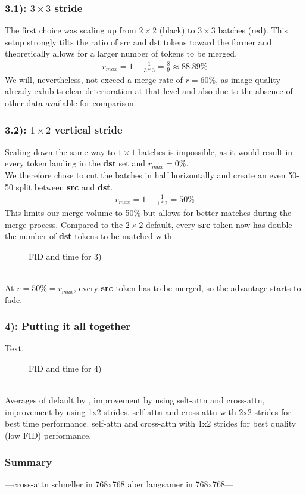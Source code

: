 \subsubsection*{3.1): $3 \times 3$ stride}
The first choice was scaling up from $2 \times 2$ (black) to $3 \times 3$ batches (red). This setup strongly tilts the ratio of src and dst tokens toward the former and theoretically allows for a larger number of tokens to be merged. 
\begin{align*}
    r_{max} = 1-\frac{1}{3*3} = \frac{8}{9} \approx 88.89\%
\end{align*}
We will, nevertheless, not exceed a merge rate of \(r=60\%\), as image quality already exhibits clear deterioration at that level and also due to the absence of other data available for comparison.



\subsubsection*{3.2): $1 \times 2$ vertical stride}
Scaling down the same way to $1 \times 1$ batches is impossible, as it would result in every token landing in the \textbf{dst} set and \(r_{max}=0\%\).\\
We therefore chose to cut the batches in half horizontally and create an even 50-50 split between \textbf{src} and \textbf{dst}.
\begin{align*}
    r_{max} = 1-\frac{1}{1*2} = 50\%
\end{align*}
This limits our merge volume to 50\% but allows for better matches during the merge process. Compared to the $2 \times 2$ default, every \textbf{src} token now has double the number of \textbf{dst} tokens to be matched with.
\begin{figure}[!htb]
    
    
\caption{FID and time for 3)}
\label{fig:exp_3}
\end{figure}\\

At \(r=50\%=r_{max}\), every \textbf{src} token has to be merged, so the advantage starts to fade.



\newpage
\subsubsection*{4): Putting it all together}
Text.\begin{figure}[!htb]
    
    
\caption{FID and time for 4)}
\label{fig:exp_4}
\end{figure}\\
Averages of default by \cite{bolya2023tomesd}, improvement by using selt-attn and cross-attn, improvement by using 1x2 strides. 
self-attn and cross-attn with 2x2 strides for best time performance. self-attn and cross-attn with 1x2 strides for best quality (low FID) performance.



\subsubsection*{Summary}
---cross-attn schneller in 768x768 aber langsamer in 768x768---